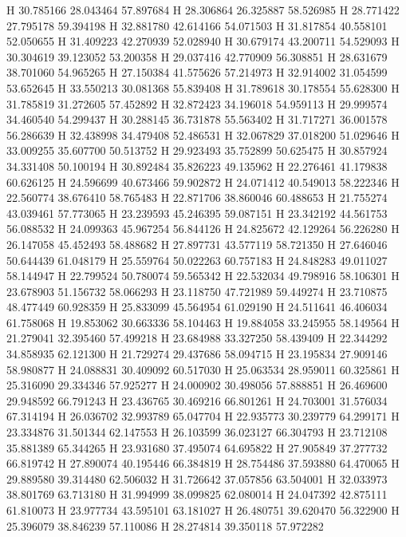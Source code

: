 \documentclass{article}
\begin{document}
H 30.785166 28.043464 57.897684 
H 28.306864 26.325887 58.526985 
H 28.771422 27.795178 59.394198 
H 32.881780 42.614166 54.071503 
H 31.817854 40.558101 52.050655 
H 31.409223 42.270939 52.028940 
H 30.679174 43.200711 54.529093 
H 30.304619 39.123052 53.200358 
H 29.037416 42.770909 56.308851 
H 28.631679 38.701060 54.965265 
H 27.150384 41.575626 57.214973 
H 32.914002 31.054599 53.652645 
H 33.550213 30.081368 55.839408 
H 31.789618 30.178554 55.628300 
H 31.785819 31.272605 57.452892 
H 32.872423 34.196018 54.959113 
H 29.999574 34.460540 54.299437 
H 30.288145 36.731878 55.563402 
H 31.717271 36.001578 56.286639 
H 32.438998 34.479408 52.486531 
H 32.067829 37.018200 51.029646 
H 33.009255 35.607700 50.513752 
H 29.923493 35.752899 50.625475 
H 30.857924 34.331408 50.100194 
H 30.892484 35.826223 49.135962 
H 22.276461 41.179838 60.626125 
H 24.596699 40.673466 59.902872 
H 24.071412 40.549013 58.222346 
H 22.560774 38.676410 58.765483 
H 22.871706 38.860046 60.488653 
H 21.755274 43.039461 57.773065 
H 23.239593 45.246395 59.087151 
H 23.342192 44.561753 56.088532 
H 24.099363 45.967254 56.844126 
H 24.825672 42.129264 56.226280 
H 26.147058 45.452493 58.488682 
H 27.897731 43.577119 58.721350 
H 27.646046 50.644439 61.048179 
H 25.559764 50.022263 60.757183 
H 24.848283 49.011027 58.144947 
H 22.799524 50.780074 59.565342 
H 22.532034 49.798916 58.106301 
H 23.678903 51.156732 58.066293 
H 23.118750 47.721989 59.449274 
H 23.710875 48.477449 60.928359 
H 25.833099 45.564954 61.029190 
H 24.511641 46.406034 61.758068 
H 19.853062 30.663336 58.104463 
H 19.884058 33.245955 58.149564 
H 21.279041 32.395460 57.499218 
H 23.684988 33.327250 58.439409 
H 22.344292 34.858935 62.121300 
H 21.729274 29.437686 58.094715 
H 23.195834 27.909146 58.980877 
H 24.088831 30.409092 60.517030 
H 25.063534 28.959011 60.325861 
H 25.316090 29.334346 57.925277 
H 24.000902 30.498056 57.888851 
H 26.469600 29.948592 66.791243 
H 23.436765 30.469216 66.801261 
H 24.703001 31.576034 67.314194 
H 26.036702 32.993789 65.047704 
H 22.935773 30.239779 64.299171 
H 23.334876 31.501344 62.147553 
H 26.103599 36.023127 66.304793 
H 23.712108 35.881389 65.344265 
H 23.931680 37.495074 64.695822 
H 27.905849 37.277732 66.819742 
H 27.890074 40.195446 66.384819 
H 28.754486 37.593880 64.470065 
H 29.889580 39.314480 62.506032 
H 31.726642 37.057856 63.504001 
H 32.033973 38.801769 63.713180 
H 31.994999 38.099825 62.080014 
H 24.047392 42.875111 61.810073 
H 23.977734 43.595101 63.181027 
H 26.480751 39.620470 56.322900 
H 25.396079 38.846239 57.110086 
H 28.274814 39.350118 57.972282 
\end{document}
